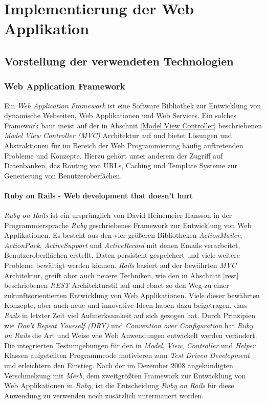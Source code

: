 \chapter{Implementierung der Web Applikation}

\section{Vorstellung der verwendeten Technologien}

\subsection{Web Application Framework}

Ein \textit{Web Application Framework} ist eine Software Bibliothek
zur Entwicklung von dynamische Webseiten, Web Applikationen und Web
Services. Ein solches Framework baut meist auf der in Abschnit
\ref{Model View Controller} beschriebenen \textit{Model View
  Controller (MVC)} 
Architektur auf und bietet Lösungen und Abstraktionen für im Bereich
der Web Programmierung häufig auftretenden Probleme und
Konzepte. Hierzu gehört unter anderem der Zugriff auf Datenbanken, das
Routing von URLs, Caching und Template Systeme zur Generierung von
Benutzeroberfächen.

\subsubsection{Ruby on Rails - Web development that doesn't hurt}

\textit{Ruby on Rails} ist ein ursprünglich von David Heinemeier
Hansson in der Programmiersprache \textit{Ruby} geschriebenes
Framework zur Entwicklung von Web Applikationen. Es besteht aus den
vier größeren Bibliotheken \textit{ActionMailer}, \textit{ActionPack},
\textit{ActiveSupport} und \textit{ActiveRecord} mit denen Emails
verarbeitet, Benutzeroberflächen erstellt, Daten persistent
gespeichert und viele weitere Probleme bewältigt werden
können. \textit{Rails} basiert auf der bewährten \textit{MVC}
Architektur, greift aber auch neuere Techniken, wie den in Abschnitt
\ref{rest} beschriebenen \textit{REST}
 Architekturstil
auf und ebnet so den Weg zu einer zukunftsorientierten Entwicklung von
Web Applikationen. Viele dieser bewährten Konzepte, aber auch neue und
innovative Ideen haben dazu beigetragen, dass \textit{Rails} in
letzter Zeit viel Aufmerksamkeit auf sich gezogen hat. Durch
Prinzipien wie \textit{Don't Repeat Yourself (DRY)}
 und \textit{Convention over
  Configuration} hat \textit{Ruby on Rails} die Art und Weise wie Web
Anwendungen entwickelt werden verändert. Die integrierten
Testumgebungen für den in \textit{Model}, \textit{View},
\textit{Controller} und \textit{Helper} Klassen aufgeteilten
Programmcode motivieren zum \textit{Test Driven Development} und
erleichtern den Einstieg.  Nach der im Dezember 2008 angekündigten
Verschmelzung mit \textit{Merb}, dem zweitgrößten Framework zur
Entwicklung von Web Applikationen in \textit{Ruby}, ist die
Entscheidung \textit{Ruby on Rails} für diese Anwendung zu verwenden
noch zusätzlich untermauert worden.

